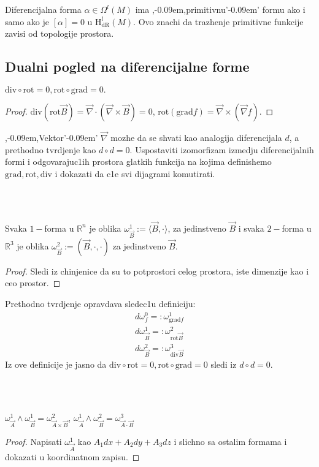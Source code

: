 \documentclass[a4paper,12pt]{article}
\newcommand{\RR}{\mathbb{R}}
\newcommand{\hdr}[1]{\mathrm{H}_\mathrm{dR}^{#1}}
\newcommand{\grad}{\mathrm{grad}}
\newcommand{\rot}{\mathrm{rot}}
\renewcommand{\div}{\mathrm{div}}
\renewcommand{\vec}{\overrightarrow}
\def\zn{,\kern-0.09em,} %
\def\zng{'\kern-0.09em' } %
\begin{document}
\begin{nap}
	Diferencijalna forma $\alpha \in \Omega^{l}(M)$ ima \zn primitivnu\zng formu ako i samo ako je $[\alpha] = 0$ u $\hdr{l}(M)$. Ovo 
	znachi da trazhenje primitivne funkcije zavisi od topologije prostora.
\end{nap}

\subsection{Dualni pogled na diferencijalne forme}

\begin{tvr}
	\( \div \circ \rot = 0, \rot \circ \grad = 0 .\)
\end{tvr}
\begin{proof}
	$\div (\rot \vec B) = \vec \nabla \cdot (\vec \nabla \times \vec B) = 0$, $\rot (\grad f) = \vec \nabla \times (\vec \nabla  f)$.
\end{proof}

\begin{nap}
	\zn Vektor\zng $\vec \nabla$ mozhe da se s\-hvati kao analogija diferencijala $d$, a prethodno tvrdjenje kao $d\circ d = 0$.
	Uspostaviti izomorfizam izmedju diferencijalnih formi i odgovarajuc1ih prostora glatkih funkcija na kojima definishemo
	$\grad, \rot, \div$ i dokazati da c1e svi dijagrami komutirati.
\end{nap}
\\ \\
\begin{tvr}
	Svaka $1-$forma u $\RR^n$ je oblika $\omega^1_{\vec B} := \langle \vec B, \cdot \rangle$, za jedinstveno $\vec B$ i 
	svaka $2-$forma u $\RR^3$ je oblika $\omega^2_{\vec B} := (\vec B, \cdot, \cdot) $ za jedinstveno $\vec B$.
\end{tvr}
\begin{proof}
	Sledi iz chinjenice da su to potprostori celog prostora, iste dimenzije kao i ceo prostor.
\end{proof}

\begin{nap}
	Prethodno tvrdjenje opravdava sledec1u definiciju:
	\begin{align*}
		d\omega^0_f =:\omega^1_{\grad f} \\
		d\omega^1_{\vec B} =:\omega^2_{\rot \vec B} \\
		d\omega^2_{\vec B} =:\omega^3_{\div \vec B}
	\end{align*}
	Iz ove definicije je jasno da \( \div \circ \rot = 0, \rot \circ \grad = 0 \) sledi iz $d \circ d = 0$.
\end{nap}
\\ \\
\begin{pr}
	\( \omega^1_{\vec A}\wedge \omega^1_{\vec B} = \omega^2_{\vec A \times \vec B}\),
	\( \omega^1_{\vec A}\wedge \omega^2_{\vec B} = \omega^3_{\vec A \cdot \vec B}\) 
\end{pr}
\begin{proof}
	Napisati $ \omega^1_{\vec A}$ kao $A_1dx + A_2dy + A_3dz$ i slichno sa ostalim formama i dokazati u 
	koordinatnom zapisu.
\end{proof}
\end{document}
